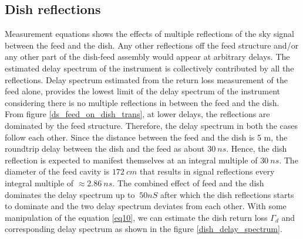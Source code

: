 \documentclass[twocolumn]{emulateapj}
\begin{document}
\subsection{Dish reflections}
Measurement equations shows the effects of multiple reflections of the sky signal between the feed and the dish. Any other reflections off the feed structure and/or any other part of the dish-feed assembly would appear at arbitrary delays. The estimated delay spectrum of the instrument is collectively contributed by all the reflections. Delay spectrum estimated from the return loss measurement of the feed alone,  provides the lowest limit of the delay spectrum of the instrument considering there is no multiple reflections in between the feed and the dish. 
From figure \ref{ds_feed_on_dish_trans}, at lower delays, the reflections are dominated by the feed structure. Therefore, the delay spectrum in both the cases follow each other. Since the distance between the feed and the dish is 5 m, the roundtrip delay between the dish and the feed as about $30~ns$. Hence, the dish reflection is expected to manifest themselves at an integral multiple of $30~ns$. The diameter of the feed cavity is $172~cm$  that results in signal reflections every integral multiple of $\approx2.86~ns$. The combined effect of feed and the dish dominates the delay spectrum up to $\> 50nS$ after which the dish reflections starts to dominate and the two delay spectrum deviates from each other. With some manipulation of the equation \ref{eq10}, we can estimate the dish return loss $\Gamma_{d}$ and corresponding delay spectrum as shown in the figure \ref{dish_delay_spectrum}.
\end{document}
